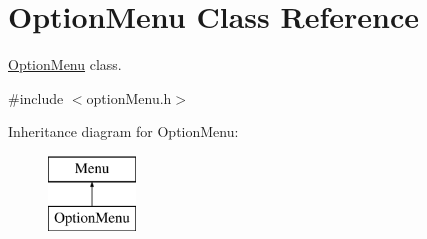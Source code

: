 \hypertarget{class_option_menu}{}\section{Option\+Menu Class Reference}
\label{class_option_menu}


\hyperlink{class_option_menu}{Option\+Menu} class.  




{\ttfamily \#include $<$option\+Menu.\+h$>$}

Inheritance diagram for Option\+Menu\+:\begin{figure}[H]
\begin{center}
\leavevmode
\includegraphics[height=2.000000cm]{class_option_menu}
\end{center}
\end{figure}
